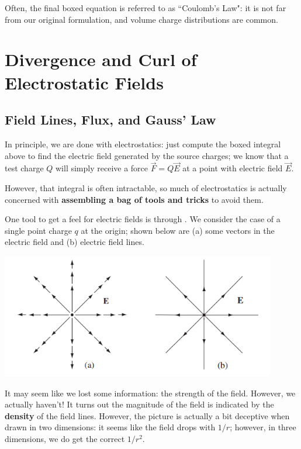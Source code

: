 Often, the final boxed equation is referred to as ``Coulomb's Law": it is not far from our original formulation, and volume charge distributions are common.

\section{Divergence and Curl of Electrostatic Fields}

\subsection{Field Lines, Flux, and Gauss' Law}

In principle, we are done with electrostatics: just compute the boxed integral above to find the electric field generated by the source charges; we know that a test charge $Q$ will simply receive a force $\vec{F}=Q\vec{E}$ at a point with electric field $\vec{E}$.

However, that integral is often intractable, so much of electrostatics is actually concerned with \textbf{assembling a bag of tools and tricks} to avoid them.

One tool to get a feel for electric fields is through . We consider the case of a single point charge $q$ at the origin; shown below are (a) some vectors in the electric field and (b) electric field lines.

\begin{center}
    \includegraphics[width=12cm]{Electrodynamics/images/fig2.12.PNG}
\end{center}

It may seem like we lost some information: the strength of the field. However, we actually haven't! It turns out the magnitude of the field is indicated by the \textbf{density} of the field lines. However, the picture is actually a bit deceptive when drawn in two dimensions: it seems like the field drops with $1/r$; however, in three dimensions, we do get the correct $1/r^2$.

